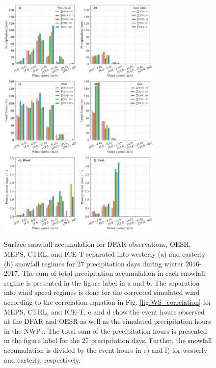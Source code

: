 \documentclass{ametsocV5}
\begin{document}
\begin{figure}
    \noindent\includegraphics[width=19pc,angle=0]{fig7.png}\\
    \caption{Surface snowfall accumulation for DFAR observations, OESR, MEPS, CTRL, and ICE-T separated into westerly (a) and easterly (b) snowfall regimes for 27 precipitation days during winter 2016-2017. The sum of total precipitation accumulation in each snowfall regime is presented in the figure label in a and b. The separation into wind speed regimes is done for the corrected simulated wind according to the correlation equation in Fig. \ref{fig:WS_correlation} for MEPS, CTRL, and ICE-T. c and d show the event hours observed at the DFAR and OESR as well as the simulated precipitation hours in the NWPs. The total sum of the precipitation hours is presented in the figure label for the 27 precipitation days. Further, the snowfall accumulation is divided by the event hours in e) and f) for westerly and easterly, respectively.
    }
    \label{fig:sfc_WS_WD}
\end{figure}
    
\end{document}
